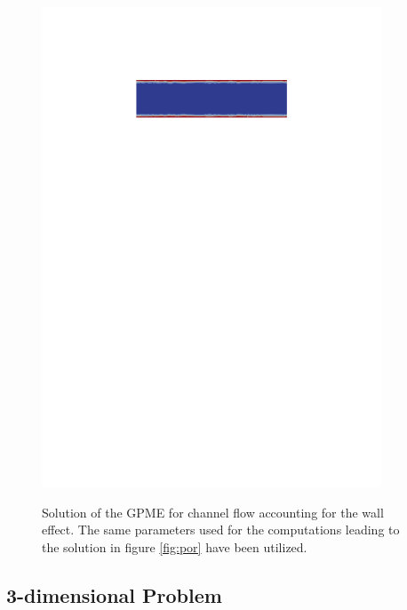 \documentclass{article}
\begin{document}
\begin{figure}[p]
{   \includegraphics[width=0.9\textwidth,trim=5.5cm 21.5cm 4cm 3cm, clip=true]{fig/Wall_por.pdf}
}
        \caption{Solution of the GPME for channel flow accounting for the wall effect. The same parameters used for the computations leading to the solution in figure \ref{fig:por} have been utilized.}\label{fig:var_poro}
\end{figure}

\subsection{3-dimensional Problem}
\end{document}
